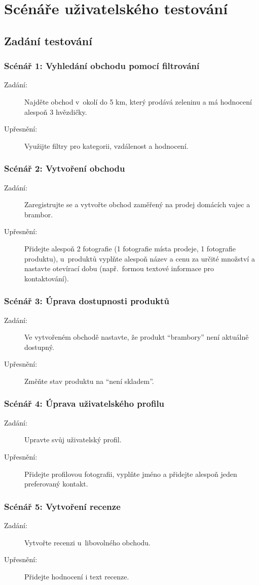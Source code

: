 \chapter{Scénáře uživatelského testování}\label{ch:user_testing}


\section{Zadání testování}

\subsection{Scénář 1: Vyhledání obchodu pomocí filtrování}
\begin{description}
    \item[Zadání:] Najděte obchod v~okolí do 5 km, který prodává zeleninu a má hodnocení alespoň 3 hvězdičky.
    \item[Upřesnění:] Využijte filtry pro kategorii, vzdálenost a hodnocení.
\end{description}

\subsection{Scénář 2: Vytvoření obchodu}
\begin{description}
    \item[Zadání:] Zaregistrujte se a vytvořte obchod zaměřený na prodej domácích vajec a brambor.
    \item[Upřesnění:] Přidejte alespoň 2 fotografie (1 fotografie místa prodeje, 1 fotografie produktu), u~produktů vyplňte alespoň název a cenu za určité množství a nastavte otevírací dobu (např.\ formou textové informace pro kontaktování).
\end{description}

\subsection{Scénář 3: Úprava dostupnosti produktů}
\begin{description}
    \item[Zadání:] Ve vytvořeném obchodě nastavte, že produkt \enquote{brambory} není aktuálně dostupný.
    \item[Upřesnění:] Změňte stav produktu na \enquote{není skladem}.
\end{description}

\subsection{Scénář 4: Úprava uživatelského profilu}
\begin{description}
    \item[Zadání:] Upravte svůj uživatelský profil.
    \item[Upřesnění:] Přidejte profilovou fotografii, vyplňte jméno a přidejte alespoň jeden preferovaný kontakt.
\end{description}

\subsection{Scénář 5: Vytvoření recenze}
\begin{description}
    \item[Zadání:] Vytvořte recenzi u~libovolného obchodu.
    \item[Upřesnění:] Přidejte hodnocení i text recenze.
\end{description}